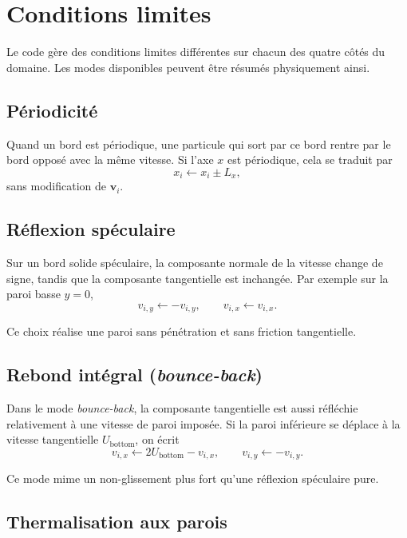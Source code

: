 \documentclass[11pt,a4paper]{article}
\begin{document}
\section{Conditions limites}

Le code gère des conditions limites différentes sur chacun des quatre côtés du domaine. Les modes disponibles peuvent être résumés physiquement ainsi.

\subsection{Périodicité}

Quand un bord est périodique, une particule qui sort par ce bord rentre par le bord opposé avec la même vitesse. Si l'axe $x$ est périodique, cela se traduit par
\begin{equation}
 x_i \leftarrow x_i \pm L_x,
\end{equation}
sans modification de $\bm{v}_i$.

\subsection{Réflexion spéculaire}

Sur un bord solide spéculaire, la composante normale de la vitesse change de signe, tandis que la composante tangentielle est inchangée. Par exemple sur la paroi basse $y=0$,
\begin{equation}
 v_{i,y} \leftarrow -v_{i,y},
\qquad
 v_{i,x} \leftarrow v_{i,x}.
\end{equation}

Ce choix réalise une paroi sans pénétration et sans friction tangentielle.

\subsection{Rebond intégral (\emph{bounce-back})}

Dans le mode \emph{bounce-back}, la composante tangentielle est aussi réfléchie relativement à une vitesse de paroi imposée. Si la paroi inférieure se déplace à la vitesse tangentielle $U_{\mathrm{bottom}}$, on écrit
\begin{equation}
 v_{i,x} \leftarrow 2U_{\mathrm{bottom}} - v_{i,x},
\qquad
 v_{i,y} \leftarrow -v_{i,y}.
\end{equation}

Ce mode mime un non-glissement plus fort qu'une réflexion spéculaire pure.

\subsection{Thermalisation aux parois}
\end{document}
